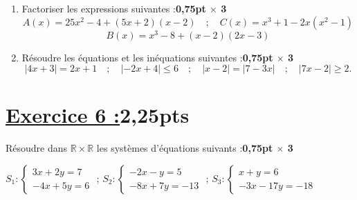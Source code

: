 \documentclass[12pt,a4paper]{article}
\begin{document}
\begin{enumerate}
    \item Factoriser les expressions suivantes :\textbf{0,75pt $\times$ 3}
    \[
    A(x) = 25x^2 - 4 + (5x + 2)(x - 2) \quad ; \quad C(x) = x^3 + 1 - 2x(x^2 - 1)
    \]
    \[
    B(x) = x^3 - 8 + (x - 2)(2x - 3)
    \]
    
    \item Résoudre les équations et les inéquations suivantes :\textbf{0,75pt $\times$ 3}
    \[
    |4x + 3| = 2x + 1 \quad ; \quad |-2x + 4| \leq 6 \quad ; \quad |x - 2| = |7 - 3x| \quad ; \quad |7x - 2| \geq 2.
    \]
\end{enumerate}

\section*{\underline{Exercice 6 :}2,25pts}

 Résoudre dans \( \mathbb{R} \times \mathbb{R} \) les systèmes d’équations suivants :\textbf{0,75pt $\times$ 3}
    
        \( S_1: 
        \begin{cases} 
            3x + 2y = 7 \\
            -4x + 5y = 6
        \end{cases} \)
        \quad ; \quad
        \( S_2: 
        \begin{cases} 
            -2x - y = 5 \\
            -8x + 7y = -13
        \end{cases} \)
        \quad ; \quad
        \( S_3: 
        \begin{cases} 
            x + y = 6 \\
            -3x - 17y = -18
        \end{cases} \)
\end{document}
